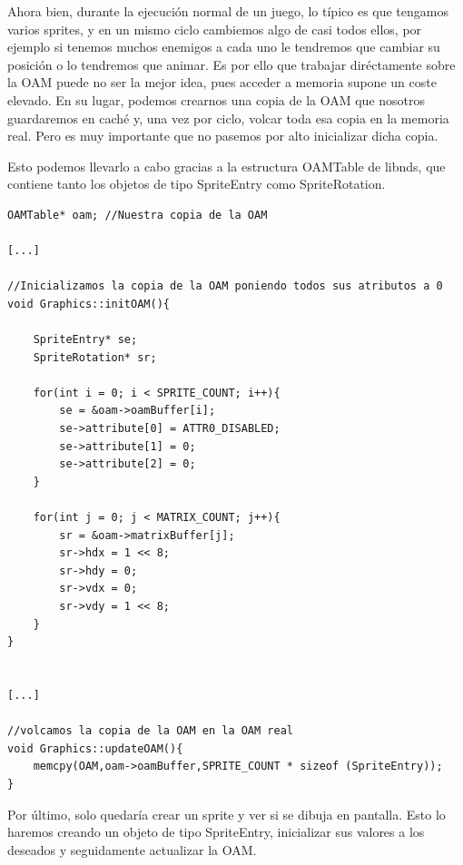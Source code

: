 Ahora bien, durante la ejecución normal de un juego, lo típico es que tengamos varios sprites, y en un mismo ciclo cambiemos algo de casi todos ellos, por ejemplo si tenemos muchos enemigos a cada uno le tendremos que cambiar su posición o lo tendremos que animar. Es por ello que trabajar diréctamente sobre la OAM puede no ser la mejor idea, pues acceder a memoria supone un coste elevado. En su lugar, podemos crearnos una copia de la OAM que nosotros guardaremos en caché y, una vez por ciclo, volcar toda esa copia en la memoria real. Pero es muy importante que no pasemos por alto inicializar dicha copia.

\vspace{0.5cm}

Esto podemos llevarlo a cabo gracias a la estructura OAMTable de libnds, que contiene tanto los objetos de tipo SpriteEntry como SpriteRotation.

\vspace{0.5cm}


\begin{lstlisting}[caption={Declaración de la copia de la OAM y}, label={oamupdate}]
OAMTable* oam; //Nuestra copia de la OAM

[...]

//Inicializamos la copia de la OAM poniendo todos sus atributos a 0
void Graphics::initOAM(){

   	SpriteEntry* se;
	SpriteRotation* sr;

	for(int i = 0; i < SPRITE_COUNT; i++){
		se = &oam->oamBuffer[i];
		se->attribute[0] = ATTR0_DISABLED;
		se->attribute[1] = 0;
		se->attribute[2] = 0;
	}

	for(int j = 0; j < MATRIX_COUNT; j++){
		sr = &oam->matrixBuffer[j];
		sr->hdx = 1 << 8;
		sr->hdy = 0;
		sr->vdx = 0;
		sr->vdy = 1 << 8;
	}
}


[...]

//volcamos la copia de la OAM en la OAM real
void Graphics::updateOAM(){
	memcpy(OAM,oam->oamBuffer,SPRITE_COUNT * sizeof (SpriteEntry));
}

\end{lstlisting}

\vspace{0.5cm}

Por último, solo quedaría crear un sprite y ver si se dibuja en pantalla. Esto lo haremos creando un objeto de tipo SpriteEntry, inicializar sus valores a los deseados y seguidamente actualizar la OAM.

